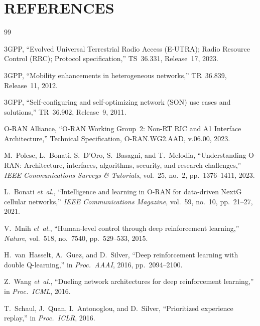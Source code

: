 \documentclass[12pt,a4paper,oneside]{report}
\begin{document}
\chapter*{REFERENCES}

\begin{thebibliography}{99}

 3GPP, ``Evolved Universal Terrestrial Radio Access
(E-UTRA); Radio Resource Control (RRC); Protocol specification,''
TS~36.331, Release~17, 2023.

 3GPP, ``Mobility enhancements in heterogeneous
networks,'' TR~36.839, Release~11, 2012.

 3GPP, ``Self-configuring and self-optimizing network
(SON) use cases and solutions,'' TR~36.902, Release~9, 2011.

 O-RAN Alliance, ``O-RAN Working Group~2:
Non-RT RIC and A1 Interface Architecture,'' Technical Specification,
O-RAN.WG2.AAD, v.06.00, 2023.

 M.~Polese, L.~Bonati, S.~D'Oro, S.~Basagni,
and T.~Melodia, ``Understanding O-RAN: Architecture, interfaces,
algorithms, security, and research challenges,'' \textit{IEEE
Communications Surveys \& Tutorials}, vol.~25, no.~2, pp.~1376--1411,
2023.

 L.~Bonati \textit{et~al.}, ``Intelligence
and learning in O-RAN for data-driven NextG cellular networks,''
\textit{IEEE Communications Magazine}, vol.~59, no.~10, pp.~21--27,
2021.

 V.~Mnih \textit{et~al.}, ``Human-level control
through deep reinforcement learning,'' \textit{Nature}, vol.~518,
no.~7540, pp.~529--533, 2015.

 H.~van~Hasselt, A.~Guez, and D.~Silver,
``Deep reinforcement learning with double Q-learning,'' in
\textit{Proc.\ AAAI}, 2016, pp.~2094--2100.

 Z.~Wang \textit{et~al.}, ``Dueling network
architectures for deep reinforcement learning,'' in \textit{Proc.\
ICML}, 2016.

 T.~Schaul, J.~Quan, I.~Antonoglou, and
D.~Silver, ``Prioritized experience replay,'' in \textit{Proc.\
ICLR}, 2016.


\end{thebibliography}
\end{document}
